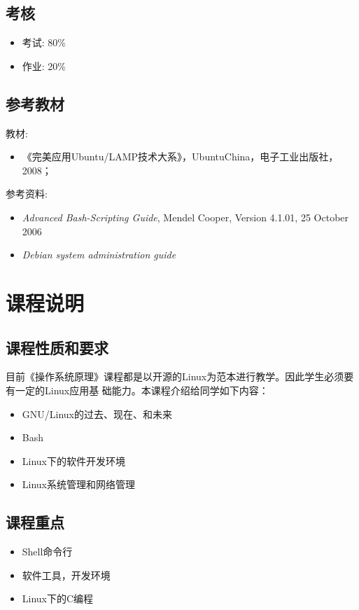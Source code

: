 \documentclass[12pt,a4paper]{article}
\begin{document}
\subsection{考核}

\begin{itemize}
\item 考试: 80\%
\item 作业: 20\%
\end{itemize}

\subsection{参考教材}

教材:
\begin{itemize}
\item 《完美应用Ubuntu/LAMP技术大系》，UbuntuChina，电子工业出版社，2008；
\end{itemize}
参考资料:
\begin{itemize}
\item \emph{Advanced Bash-Scripting Guide}, Mendel Cooper, Version 4.1.01, 25 October 2006
\item \emph{Debian system administration guide}
\end{itemize}

\section{课程说明}

\subsection{课程性质和要求}

目前《操作系统原理》课程都是以开源的Linux为范本进行教学。因此学生必须要有一定的Linux应用基
础能力。本课程介绍给同学如下内容：
\begin{itemize}
\item GNU/Linux的过去、现在、和未来
\item Bash
\item Linux下的软件开发环境
\item Linux系统管理和网络管理
\end{itemize}

\subsection{课程重点}

\begin{itemize}
\item Shell命令行
\item 软件工具，开发环境
\item Linux下的C编程
\end{itemize}
\end{document}

